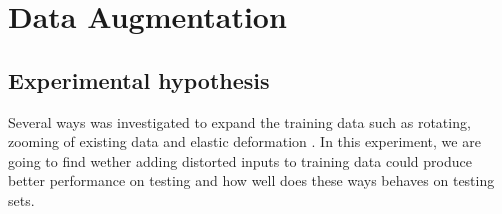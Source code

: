 \documentclass[11pt]{article}
\begin{document}
\newpage
\section{Data Augmentation}
\subsection{Experimental hypothesis}
Several ways was investigated to expand the training data such as rotating, zooming of existing data and elastic deformation \cite{Elastic}. In this experiment, we are going to find wether adding distorted inputs to training data could produce better performance on testing and how well does these ways behaves on testing sets.
\printbibliography
\end{document}
